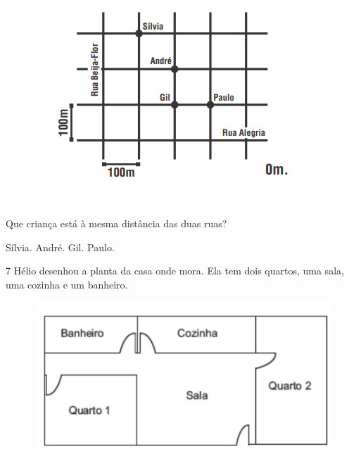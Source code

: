 \begin{figure}[H]
\centering\includegraphics[width=4.19792in,height=2.93056in]{./imgSAEB_6_MAT/media/image69.png}
\end{figure}

Que criança está à mesma distância das duas ruas?

\begin{boxlist}
 Sílvia.
 André.
 Gil.
 Paulo.
\end{boxlist}




\num{7}  Hélio desenhou a planta da casa onde mora. Ela tem dois quartos, uma
sala, uma cozinha e um banheiro.

\begin{figure}[H]
\centering\includegraphics[width=\textwidth]{./imgSAEB_6_MAT/media/image71.png}
\end{figure}

